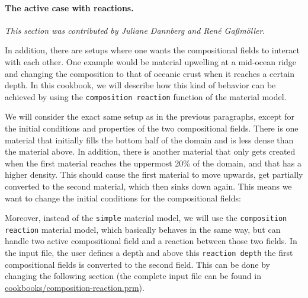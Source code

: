 \documentclass{article}
\begin{document}
\paragraph{The active case with reactions.}

\textit{This section was contributed by Juliane Dannberg and Ren{\'e} Ga{\ss}m{\"o}ller}.

In addition, there are setups where one wants the compositional fields to interact with each other. One example would be material upwelling at a mid-ocean ridge and changing the composition to that of oceanic crust when it reaches a certain depth. In this cookbook, we will describe how this kind of behavior can be achieved by using the \texttt{composition reaction} function of the material model. 

We will consider the exact same setup as in the previous paragraphs, except for the initial conditions and properties of the two compositional fields. There is one material that initially fills the bottom half of the domain and is less dense than the material above. In addition, there is another material that only gets created when the first material reaches the uppermost 20\% of the domain, and that has a higher density. This should cause the first material to move upwards, get partially converted to the second material, which then sinks down again. This means we want to change the initial conditions for the compositional fields: 




Moreover, instead of the \texttt{simple} material model, we will use the \texttt{composition reaction} material model, which basically behaves in the same way, but can handle two active compositional field and a reaction between those two fields. In the input file, the user defines a depth and above this \texttt{reaction depth} the first compositional fields is converted to the second field. This can be done by changing the following section (the complete input file can be found in \url{cookbooks/composition-reaction.prm}). 


\end{document}

